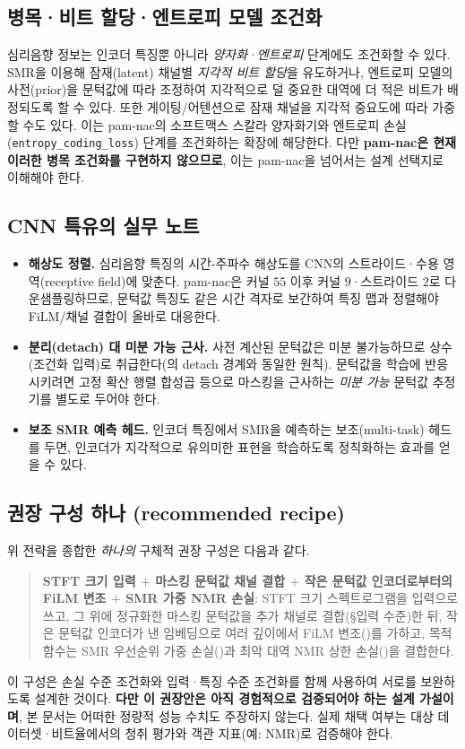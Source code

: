 \documentclass[11pt,a4paper]{article}
\begin{document}
\subsection{병목·비트 할당·엔트로피 모델 조건화}
심리음향 정보는 인코더 특징뿐 아니라 \emph{양자화·엔트로피} 단계에도 조건화할 수
있다. SMR을 이용해 잠재(latent) 채널별 \emph{지각적 비트 할당}을 유도하거나,
엔트로피 모델의 사전(prior)을 문턱값에 따라 조정하여 지각적으로 덜 중요한 대역에
더 적은 비트가 배정되도록 할 수 있다. 또한 게이팅/어텐션으로 잠재 채널을 지각적
중요도에 따라 가중할 수도 있다. 이는 pam-nac의 소프트맥스 스칼라 양자화기와
엔트로피 손실(\texttt{entropy\_coding\_loss}) 단계를 조건화하는 확장에 해당한다.
다만 \textbf{pam-nac은 현재 이러한 병목 조건화를 구현하지 않으므로}, 이는 pam-nac을
넘어서는 설계 선택지로 이해해야 한다.

\subsection{CNN 특유의 실무 노트}
\begin{itemize}
  \item \textbf{해상도 정렬.} 심리음향 특징의 시간-주파수 해상도를 CNN의
        스트라이드·수용 영역(receptive field)에 맞춘다. pam-nac은 커널 $55$
        이후 커널 $9$·스트라이드 $2$로 다운샘플링하므로, 문턱값 특징도 같은
        시간 격자로 보간하여 특징 맵과 정렬해야 FiLM/채널 결합이 올바로 대응한다.
  \item \textbf{분리(detach) 대 미분 가능 근사.} 사전 계산된 문턱값은 미분
        불가능하므로 상수(조건화 입력)로 취급한다(의 detach
        경계와 동일한 원칙). 문턱값을 학습에 반응시키려면 고정 확산 행렬 합성곱
        등으로 마스킹을 근사하는 \emph{미분 가능} 문턱값 추정기를 별도로 두어야
        한다.
  \item \textbf{보조 SMR 예측 헤드.} 인코더 특징에서 SMR을 예측하는 보조(multi-task)
        헤드를 두면, 인코더가 지각적으로 유의미한 표현을 학습하도록 정칙화하는
        효과를 얻을 수 있다.
\end{itemize}

\subsection{권장 구성 하나 (recommended recipe)}
위 전략을 종합한 \emph{하나의} 구체적 권장 구성은 다음과 같다.
\begin{quote}
\textbf{STFT 크기 입력 $+$ 마스킹 문턱값 채널 결합 $+$ 작은 문턱값 인코더로부터의
FiLM 변조 $+$ SMR 가중 NMR 손실}: STFT 크기 스펙트로그램을 입력으로 쓰고, 그 위에
정규화한 마스킹 문턱값을 추가 채널로 결합(\S 입력 수준)한 뒤, 작은 문턱값 인코더가
낸 임베딩으로 여러 깊이에서 FiLM 변조()를 가하고, 목적함수는 SMR
우선순위 가중 손실()과 최악 대역 NMR 상한 손실()을
결합한다.
\end{quote}
이 구성은 손실 수준 조건화와 입력·특징 수준 조건화를 함께 사용하여 서로를 보완하도록
설계한 것이다. \textbf{다만 이 권장안은 아직 경험적으로 검증되어야 하는 설계
가설이며}, 본 문서는 어떠한 정량적 성능 수치도 주장하지 않는다. 실제 채택 여부는
대상 데이터셋·비트율에서의 청취 평가와 객관 지표(예: NMR)로 검증해야 한다.
\end{document}
